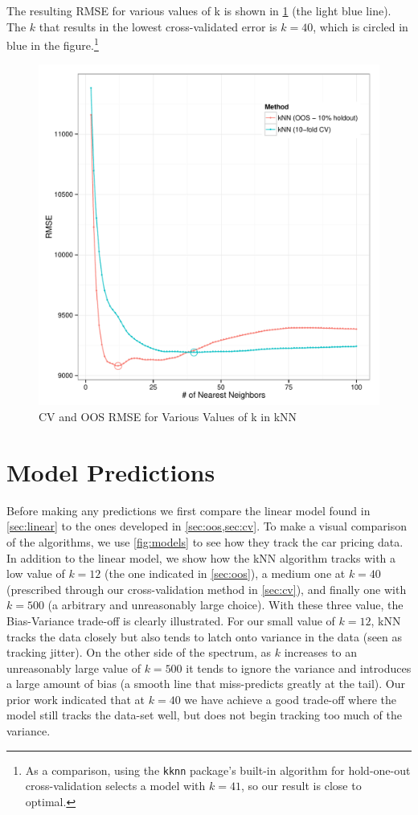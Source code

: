 \documentclass[11pt, fleqn]{article}
\begin{document}
The resulting RMSE for various values of k is shown in \cref{fig:sweep} (the light blue line). The \(k\) that results in the lowest cross-validated error is \(k=40\), which is circled in blue in the figure.\footnote{As a comparison, using the \texttt{kknn} package's built-in algorithm for hold-one-out cross-validation selects a model with \(k=41\), so our result is close to optimal.}

\begin{figure}[!htb]
  \centering
  \includegraphics[scale=.5]{sweep_kknn.pdf}
  \caption{CV and OOS RMSE for Various Values of k in kNN}
  \label{fig:sweep}
\end{figure}

\section{Model Predictions}
Before making any predictions we first compare the linear model found in \cref{sec:linear} to the ones developed in \cref{sec:oos,sec:cv}.  To make a visual comparison of the algorithms, we use \cref{fig:models} to see how they track the car pricing data.  In addition to the linear model, we show how the kNN algorithm tracks with a low value of $k=12$ (the one indicated in \cref{sec:oos}), a medium one at $k=40$ (prescribed through our cross-validation method in \cref{sec:cv}), and finally one with $k=500$ (a arbitrary and unreasonably large choice).  With these three value, the Bias-Variance trade-off is clearly illustrated.  For our small value of $k=12$, kNN tracks the data closely but also tends to latch onto variance in the data (seen as tracking jitter).  On the other side of the spectrum, as $k$ increases to an unreasonably large value of $k=500$ it tends to ignore the variance and introduces a large amount of bias (a smooth line that miss-predicts greatly at the tail).  Our prior work indicated that at $k=40$ we have achieve a good trade-off where the model still tracks the data-set well, but does not begin tracking too much of the variance.
\end{document}
